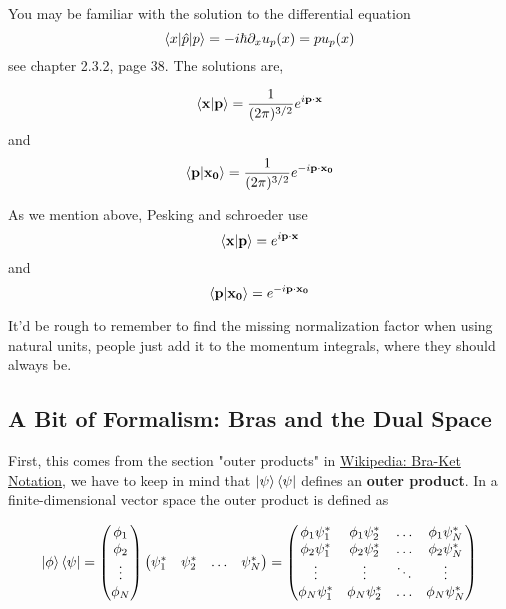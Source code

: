 You may be familiar with the solution to the differential equation
$$
\braket{ x | \hat{p} | p} = -i \hbar \partial_x u_p (x) = p u_p(x)
$$
see \cite{binney} chapter 2.3.2, page 38.
The solutions are,

$$
\braket{\boldsymbol{\mathbf{x}} | \boldsymbol{\mathbf{p}}} = \frac{1}{(2\pi)^{3/2}} e^{i\boldsymbol{\mathbf{p}}\cdot\boldsymbol{\mathbf{x}}}
$$
and 
$$
\braket{\boldsymbol{\mathbf{p}} | \boldsymbol{\mathbf{x_0}}} = \frac{1}{(2\pi)^{3/2}} e^{-i\boldsymbol{\mathbf{p}}\cdot\boldsymbol{\mathbf{x_0}}}
$$


As we mention above, Pesking and schroeder use
$$
\braket{\boldsymbol{\mathbf{x}} | \boldsymbol{\mathbf{p}}} = e^{i\boldsymbol{\mathbf{p}}\cdot\boldsymbol{\mathbf{x}}}
$$
and 
$$
\braket{\boldsymbol{\mathbf{p}} | \boldsymbol{\mathbf{x_0}}} = e^{-i\boldsymbol{\mathbf{p}}\cdot\boldsymbol{\mathbf{x_0}}}
$$

It'd be rough to remember to find the missing normalization factor when using natural units,
people just add it to the momentum integrals, where they should always be.




\subsection{A Bit of Formalism: Bras and the Dual Space} \label{formalism:bras}


First, this comes from the section "outer products" in
\href{https://en.wikipedia.org/wiki/Bra%E2%80%93ket_notation}{Wikipedia: Bra-Ket Notation},
we have to keep in mind that $\ket{\psi}\bra{\psi}$ defines an \textbf{outer product}.
In a finite-dimensional vector space the outer product is defined as

$$
\ket{\phi}\bra{\psi}
=
\begin{pmatrix}
    \phi_1 \\
    \phi_2 \\
    \vdots \\
    \phi_N 
\end{pmatrix}
\begin{pmatrix}
    \psi_{1}^{*} & \psi_{2}^{*} & \ldots & \psi_{N}^{*}
\end{pmatrix}
=
\begin{pmatrix} 
    \phi_1 \psi_{1}^{*} & \phi_1 \psi_{2}^{*} & \dots  & \phi_1 \psi_{N}^{*} \\
    \phi_2 \psi_{1}^{*} & \phi_2 \psi_{2}^{*} & \dots  & \phi_2 \psi_{N}^{*} \\
    \vdots              & \vdots              & \ddots & \vdots              \\
    \phi_N \psi_{1}^{*} & \phi_N \psi_{2}^{*} & \dots  & \phi_N \psi_{N}^{*} \\
\end{pmatrix}
$$

